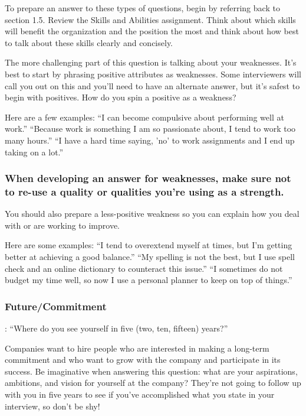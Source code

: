 To prepare an answer to these types of questions, begin by referring back to section 1.5. Review the Skills and Abilities assignment. Think about which skills will benefit the organization and the position the most and think about how best to talk about these skills clearly and concisely.

The more challenging part of this question is talking about your weaknesses. It's best to start by phrasing positive attributes as weaknesses. Some interviewers will call you out on this and you'll need to have an alternate answer, but it's safest to begin with positives. How do you spin a positive as a weakness?

Here are a few examples:
\break ``I can become compulsive about performing well at work.''
\break ``Because work is something I am so passionate about, I tend to work too many hours.''
\break ``I have a hard time saying, 'no' to work assignments and I end up taking on a lot.''

\subsubsection*{When developing an answer for weaknesses, make sure not to re-use a quality or qualities you're using as a strength.}

You should also prepare a less-positive weakness so you can explain how you deal with or are working to improve.

Here are some examples:
\break ``I tend to overextend myself at times, but I'm getting better at achieving a good balance.''
\break ``My spelling is not the best, but I use spell check and an online dictionary to counteract this issue.''
\break ``I sometimes do not budget my time well, so now I use a personal planner to keep on top of things.''

\subsubsection*{Future/Commitment}:
\break ``Where do you see yourself in five (two, ten, fifteen) years?''

Companies want to hire people who are interested in making a long-term commitment and who want to grow with the company and participate in its success. Be imaginative when answering this question: what are your aspirations, ambitions, and vision for yourself at the company? They're not going to follow up with you in five years to see if you've accomplished what you state in your interview, so don't be shy!

